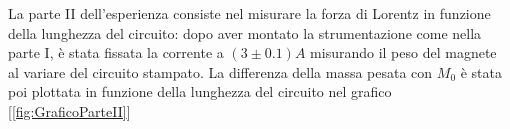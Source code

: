 {\fontsize{12}{14}\selectfont 


La parte II dell'esperienza consiste nel misurare la forza di Lorentz in funzione della lunghezza del circuito: dopo aver montato la strumentazione come nella parte I, è stata fissata la corrente a $ (3 \pm 0.1) A$ misurando il peso del magnete al variare del circuito stampato.
La differenza della massa pesata con $M_0$ è stata poi plottata in funzione della lunghezza del circuito nel grafico [\ref{fig:GraficoParteII}]


\par}